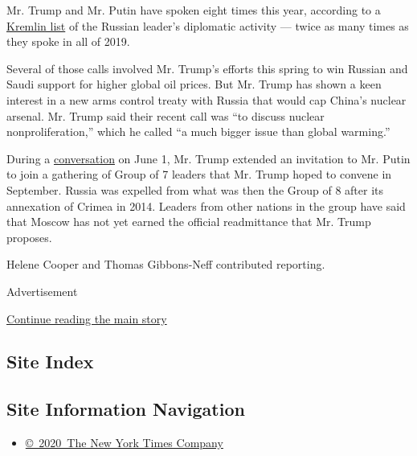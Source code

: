 Mr. Trump and Mr. Putin have spoken eight times this year, according to
a \href{http://kremlin.ru/catalog/persons/498/events/61270}{Kremlin
list} of the Russian leader's diplomatic activity --- twice as many
times as they spoke in all of 2019.

Several of those calls involved Mr. Trump's efforts this spring to win
Russian and Saudi support for higher global oil prices. But Mr. Trump
has shown a keen interest in a new arms control treaty with Russia that
would cap China's nuclear arsenal. Mr. Trump said their recent call was
``to discuss nuclear nonproliferation,'' which he called ``a much bigger
issue than global warming.''

During a
\href{https://www.nytimes.com/2020/06/01/us/politics/trump-putin-g7.html}{conversation}
on June 1, Mr. Trump extended an invitation to Mr. Putin to join a
gathering of Group of 7 leaders that Mr. Trump hoped to convene in
September. Russia was expelled from what was then the Group of 8 after
its annexation of Crimea in 2014. Leaders from other nations in the
group have said that Moscow has not yet earned the official readmittance
that Mr. Trump proposes.

Helene Cooper and Thomas Gibbons-Neff contributed reporting.

Advertisement

\protect\hyperlink{after-bottom}{Continue reading the main story}

\hypertarget{site-index}{%
\subsection{Site Index}\label{site-index}}

\hypertarget{site-information-navigation}{%
\subsection{Site Information
Navigation}\label{site-information-navigation}}

\begin{itemize}
\tightlist
\item
  \href{https://help.nytimes.com/hc/en-us/articles/115014792127-Copyright-notice}{©~2020~The
  New York Times Company}
\end{itemize}

